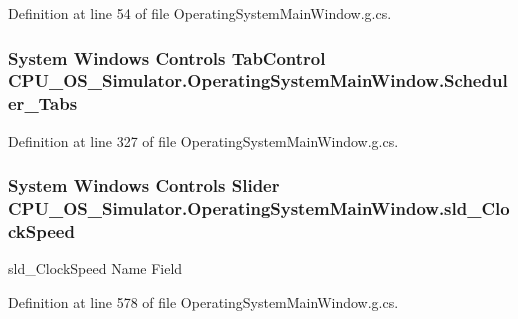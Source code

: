 Definition at line 54 of file Operating\+System\+Main\+Window.\+g.\+cs.

\hypertarget{class_c_p_u___o_s___simulator_1_1_operating_system_main_window_a2575de899df7277ae9c310931b8dbaa0}{}
\subsubsection[{Scheduler\+\_\+\+Tabs}]{\setlength{\rightskip}{0pt plus 5cm}System Windows Controls Tab\+Control C\+P\+U\+\_\+\+O\+S\+\_\+\+Simulator.\+Operating\+System\+Main\+Window.\+Scheduler\+\_\+\+Tabs\hspace{0.3cm}{\ttfamily [package]}}\label{class_c_p_u___o_s___simulator_1_1_operating_system_main_window_a2575de899df7277ae9c310931b8dbaa0}


Definition at line 327 of file Operating\+System\+Main\+Window.\+g.\+cs.

\hypertarget{class_c_p_u___o_s___simulator_1_1_operating_system_main_window_a21bd388b7e1e821db2bfcee90530c3ae}{}
\subsubsection[{sld\+\_\+\+Clock\+Speed}]{\setlength{\rightskip}{0pt plus 5cm}System Windows Controls Slider C\+P\+U\+\_\+\+O\+S\+\_\+\+Simulator.\+Operating\+System\+Main\+Window.\+sld\+\_\+\+Clock\+Speed}\label{class_c_p_u___o_s___simulator_1_1_operating_system_main_window_a21bd388b7e1e821db2bfcee90530c3ae}


sld\+\_\+\+Clock\+Speed Name Field 



Definition at line 578 of file Operating\+System\+Main\+Window.\+g.\+cs.


